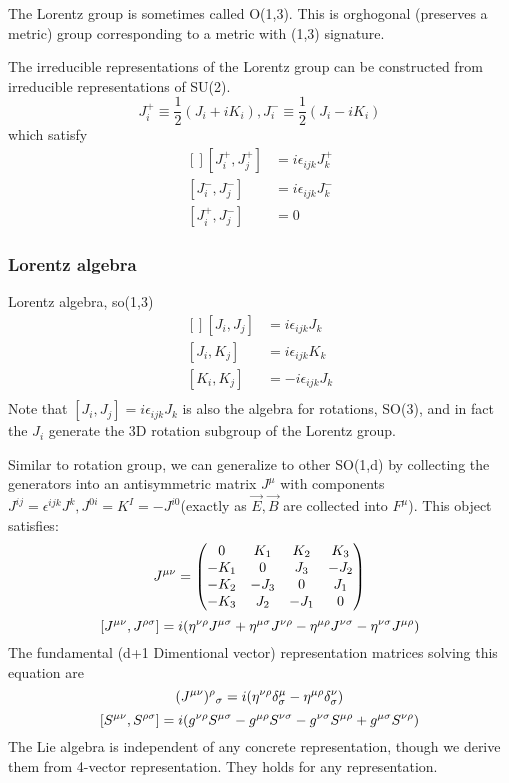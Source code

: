 The Lorentz group is sometimes called O(1,3). This is orghogonal (preserves
a metric) group corresponding to a metric with (1,3) signature.

The irreducible representations of the Lorentz group can be constructed from
irreducible representations of SU(2). 
\[
    J^+_i \equiv \frac{1}{2}(J_i + iK_i), 
    J^-_i \equiv \frac{1}{2}(J_i - iK_i)
\]
which satisfy
\[
    \begin{aligned}[]
	[J^+_i, J^+_j] &= i\epsilon_{ijk}J^+_k    \\
	[J^-_i, J^-_j] &= i\epsilon_{ijk}J^-_k    \\
	[J^+_i, J^-_j] &= 0 
    \end{aligned}
\]

\subsubsection{Lorentz algebra}
Lorentz algebra, so(1,3)
\[
    \begin{aligned}[]
	[J_i, J_j] &= i\epsilon_{ijk}J_k    \\
	[J_i, K_j] &= i\epsilon_{ijk}K_k    \\
	[K_i, K_j] &= -i\epsilon_{ijk}J_k    \\
    \end{aligned}
\]
Note that $ [J_i, J_j] = i\epsilon_{ijk}J_k $ is also the algebra for
rotations, SO(3), and in fact the $J_i$ generate the 3D rotation subgroup of
the Lorentz group.

Similar to rotation group, we can generalize to other SO(1,d) by collecting
the generators into an antisymmetric matrix $J^{\mu}$ with components
$J^{ij} = \epsilon^{ijk}J^k, J^{0i} = K^I = -J^{i0}$(exactly as $\vec{E},
\vec{B}$ are collected into $F^{\mu}$). This object satisfies:
\[
    J^{\mu\nu}=
    \begin{pmatrix}
	0   & K_1   & K_2   & K_3   \\
	-K_1	& 0 & J_3   & -J_2  \\
	-K_2	& -J_3	& 0 & J_1   \\
	-K_3	& J_2	& -J_1	& 0 \\
    \end{pmatrix}
    \]
\[
    [J^{\mu\nu}, J^{\rho\sigma}]=
    i( \eta^{\nu\rho}J^{\mu\sigma}
    +\eta^{\mu\sigma}J^{\nu\rho} 
    -\eta^{\mu\rho}J^{\nu\sigma}
    -\eta^{\nu\sigma}J^{\mu\rho}
    )
    \]
The fundamental (d+1 Dimentional vector) representation matrices solving
this equation are 
\[
    (J^{\mu\nu})^\rho{}_\sigma = i(\eta^{\nu\rho}\delta^{\mu}_\sigma -
    \eta^{\mu\rho}\delta^{\nu}_{\sigma})
    \]
\[
    [S^{\mu\nu}, S^{\rho\sigma}]=
    i( g^{\nu\rho}S^{\mu\sigma}
    -g^{\mu\rho}S^{\nu\sigma}
    -g^{\nu\sigma}S^{\mu\rho}
    +g^{\mu\sigma}S^{\nu\rho} )
    \]
The Lie algebra is independent of any concrete representation, though we
derive them from 4-vector representation. They holds for any representation.

